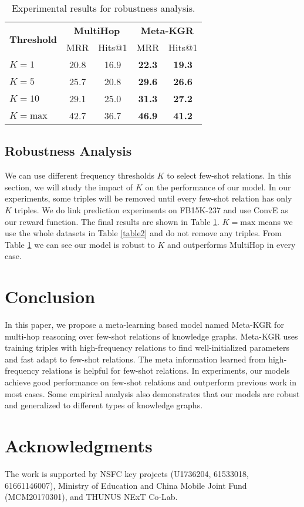 \documentclass[11pt,a4paper]{article}
\begin{document}
\begin{table}[t]
\small
\centering
\setlength{\belowcaptionskip}{-1pt}
    \begin{tabular}{l|cc|cc}
    \toprule
    \multirow{2}{*}{\textbf{Threshold}} & \multicolumn{2}{c|}{\textbf{MultiHop}} & \multicolumn{2}{c}{\textbf{Meta-KGR}} \\
    & MRR & Hits@1  & MRR & Hits@1  \\
    \midrule
    $K=1$  & 20.8  & 16.9  & \textbf{22.3}   & \textbf{19.3}   \\
    $K=5$  & 25.7  & 20.8  & \textbf{29.6}   & \textbf{26.6}   \\
    $K=10$  & 29.1  & 25.0  & \textbf{31.3}   & \textbf{27.2}  \\
    $K=\text{max}$  & 42.7  & 36.7  & \textbf{46.9}   & \textbf{41.2}    \\
    \bottomrule
    \end{tabular}
    \caption{\label{table3} Experimental results for robustness analysis.}
\end{table}

\subsection{Robustness Analysis}

We can use different frequency thresholds $K$ to select few-shot relations. In this section, we will study the impact of $K$ on the performance of our model. In our experiments, some triples will be removed until every few-shot relation has only $K$ triples. We do link prediction experiments on FB15K-237 and use ConvE as our reward function. The final results are shown in Table \ref{table3}. $K=\text{max}$ means we use the whole datasets in Table \ref{table2} and do not remove any triples. From Table \ref{table3} we can see our model is robust to $K$ and outperforms MultiHop in every case.

\section{Conclusion}

In this paper, we propose a meta-learning based model named Meta-KGR for multi-hop reasoning over few-shot relations of knowledge graphs. Meta-KGR uses training triples with high-frequency relations to find well-initialized parameters and fast adapt to few-shot relations. The meta information learned from high-frequency relations is helpful for few-shot relations. In experiments, our models achieve good performance on few-shot relations and outperform previous work in most cases. Some empirical analysis also demonstrates that our models are robust and generalized to different types of knowledge graphs.


\section*{Acknowledgments}
  
The work is supported by NSFC key projects (U1736204, 61533018, 61661146007), Ministry of Education and China Mobile Joint Fund (MCM20170301), and THUNUS NExT Co-Lab.



\end{document}
